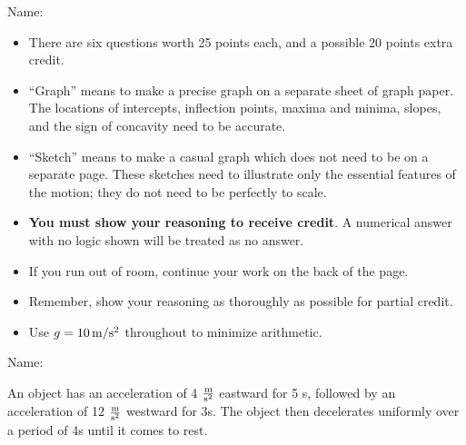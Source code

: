 \documentclass[12pt]{article}
\begin{document}
\bigskip
\bigskip
\bigskip
\bigskip

\Large \centerline{}


\vspace{2in}


\hspace{1in} Name: \underline{\hspace{3in}}

\bigskip
\bigskip


\normalsize

\vspace{1.4in}

\begin{itemize}
  \item{There are six questions worth 25 points each, and a possible 20 points extra credit.}
  \item{``Graph'' means to make a precise graph on a separate sheet of graph paper. The locations of intercepts, inflection points, maxima and minima, slopes, and the sign of concavity need to be accurate.}
  \item{``Sketch'' means to make a casual graph which does not need to be on a separate page. These sketches need to illustrate only the essential features of the motion; they do not
    need to be perfectly to scale.}
  \item{{\bf You must show your reasoning to receive credit}. A numerical answer with no logic shown will be treated as no answer.}
  \item{If you run out of room, continue your work on the back of the page.}
  \item{Remember, show your reasoning as thoroughly as possible for partial credit.}
  \item{Use $g=10\, \rm m/\rm s^2$ throughout to minimize arithmetic.}
\end{itemize}
\newpage
\small





\begin{flushright}
    Name: \underline{\hspace{3in}}
    \end{flushright}
  
    \Large \centerline{}
    \normalsize
  \rm

  An object has an acceleration of 4 $\frac{\rm m}{\rm s^2}$ eastward for 5 s, followed by an acceleration of 12 $\frac{\rm m}{\rm s^2}$ westward for 3s. The object then 
  decelerates uniformly over a period of 4s until it comes to rest.
\end{document}
